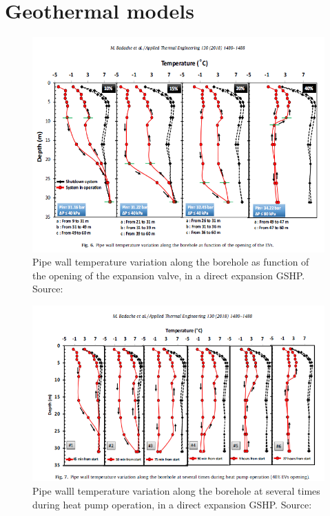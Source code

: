 \section{Geothermal models}\label{as:gtw}
\begin{figure}[tph]
	\centering
	\includegraphics[width=0.7\linewidth]{Images/gtw_model1}
	\caption{Pipe wall temperature variation along the borehole as function of the opening of the expansion valve, in a direct expansion GSHP. Source: ~\cite{badacheExperimentalStudyCarbon2018}}
	\label{fig:gtwmodel1}
\end{figure}
\begin{figure}[tph]
	\centering
	\includegraphics[width=0.7\linewidth]{Images/gtw_model2}
	\caption{Pipe walll temperature variation along the borehole at several times during heat pump operation, in a direct expansion GSHP. Source: ~\cite{badacheExperimentalStudyCarbon2018}}
	\label{fig:gtwmodel2}
\end{figure}

